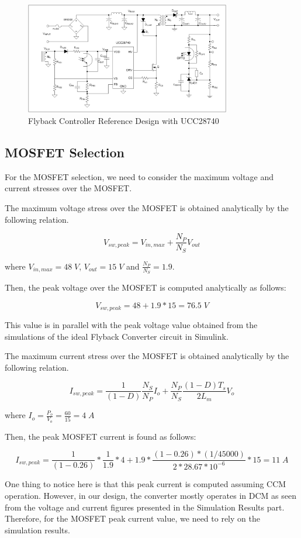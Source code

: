 \begin{figure}[H]
\centering
\includegraphics [width=0.8\textwidth]{figures/Analog_Controller.png}
\caption{Flyback Controller Reference Design with UCC28740}
\label{fig:analog_cont}
\end{figure}

\subsection{MOSFET Selection}
For the MOSFET selection, we need to consider the maximum voltage and current stresses over the MOSFET.

The maximum voltage stress over the MOSFET is obtained analytically by the following relation.

$$ V_{sw,peak} = V_{in,max} + \frac{N_P}{N_S}V_{out} $$

where $ V_{in,max} = 48\;V $, $ V_{out} = 15\;V $ and $ \frac{N_P}{N_S} = 1.9 $.

Then, the peak voltage over the MOSFET is computed analytically as follows:

$$ V_{sw,peak} = 48 + 1.9*15 = 76.5\;V $$

This value is in parallel with the peak voltage value obtained from the simulations of the ideal Flyback Converter circuit in Simulink.

The maximum current stress over the MOSFET is obtained analytically by the following relation.

$$ I_{sw,peak} = \frac{1}{(1-D)}\frac{N_S}{N_P}I_o + \frac{N_P}{N_S}\frac{(1-D)T_s}{2L_m}V_o $$

where $ I_o = \frac{P_o}{V_o} = \frac{60}{15} = 4\;A $

Then, the peak MOSFET current is found as follows:

$$ I_{sw,peak} = \frac{1}{(1-0.26)}*\frac{1}{1.9}*4 + 1.9*\frac{(1-0.26)*(1/45000)}{2*28.67*10^{-6}}*15 = 11\;A$$

One thing to notice here is that this peak current is computed assuming CCM operation. However, in our design, the converter mostly operates in DCM as seen from the voltage and current figures presented in the Simulation Results part. Therefore, for the MOSFET peak current value, we need to rely on the simulation results.

